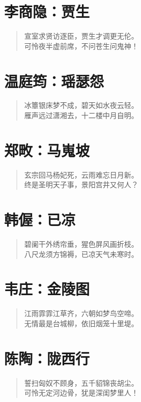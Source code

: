 \documentclass[12pt,oneside]{book}
\newenvironment{shici}{%
\begin{verse}\centering\yanti\large\hspace{12pt}}{\end{verse}}
\begin{document}
\begin{common-format}
\chapter{李商隐：贾生}
\begin{shici}
宣室求贤访逐臣，贾生才调更无伦。\\
可怜夜半虚前席，不问苍生问鬼神！
\end{shici}

\chapter{温庭筠：瑶瑟怨}
\begin{shici}
冰簟银床梦不成，碧天如水夜云轻。\\
雁声远过潇湘去，十二楼中月自明。
\end{shici}

\chapter{郑畋：马嵬坡}
\begin{shici}
玄宗回马杨妃死，云雨难忘日月新。\\
终是圣明天子事，景阳宫井又何人？
\end{shici}

\chapter{韩偓：已凉}
\begin{shici}
碧阑干外绣帘垂，猩色屏风画折枝。\\
八尺龙须方锦褥，已凉天气未寒时。
\end{shici}

\chapter{韦庄：金陵图}
\begin{shici}
江雨霏霏江草齐，六朝如梦鸟空啼。\\
无情最是台城柳，依旧烟笼十里堤。
\end{shici}

\chapter{陈陶：陇西行}
\begin{shici}
誓扫匈奴不顾身，五千貂锦丧胡尘。\\
可怜无定河边骨，犹是深闺梦里人！
\end{shici}


\end{common-format}
\end{document}
